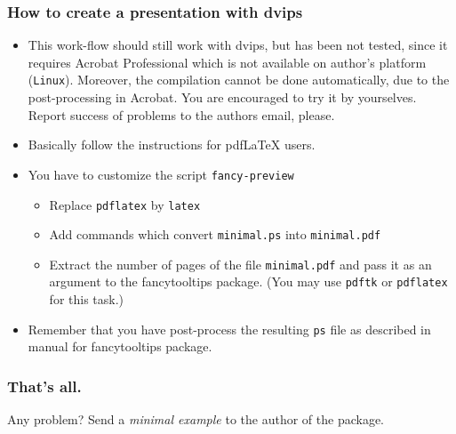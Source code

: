 \documentclass[envcountsect,t,10pt]{beamer}
\begin{document}
 \begin{frame}
   \frametitle{How to create a presentation with dvips}
   \begin{itemize}
   \item This work-flow should still work with dvips, but has been not 
     tested, since it
     requires Acrobat Professional which is not available on author's
     platform (\texttt{Linux}). Moreover, the compilation cannot be
     done automatically, due to the post-processing in Acrobat. You
     are encouraged to try it by yourselves. Report success of problems 
     to the authors email, please.
   \item Basically follow the instructions for pdf\LaTeX{} users.
   \item You have to customize the script \texttt{fancy-preview}
     \begin{itemize}
     \item Replace \texttt{pdflatex} by \texttt{latex}
     \item Add commands which convert \texttt{minimal.ps} into
       \texttt{minimal.pdf}
     \item Extract the number of pages of the file
       \texttt{minimal.pdf} and pass it as an argument to the
       fancytooltips package. (You may use \texttt{pdftk} or
       \texttt{pdflatex} for this task.)
     \end{itemize}
     \item Remember that you have post-process the resulting
       \texttt{ps} file as described in manual for fancytooltips
       package.
   \end{itemize}
 \end{frame}
 

\begin{frame}
  \frametitle{That's all. }
  Any problem? Send a \textit{minimal example} to the author of the
  package.
\end{frame}
\end{document}
